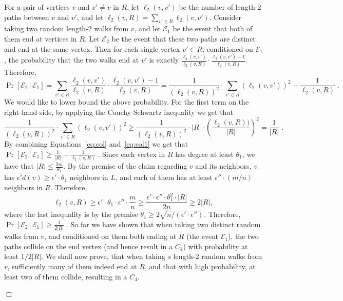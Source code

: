 \documentclass{article}
\newcommand{\eps}{\epsilon}
\newenvironment{proof}{\smallskip\noindent{\bf Proof:}}%
        {\hspace*{\fill}$\Box$\par}
\begin{document}
\begin{proof}
For a pair of vertices $v$ and $v'\neq v$ in $R$, let $\ell_2(v,v')$ be the number of length-2 paths between $v$ and $v'$, and let $\ell_2(v,R) = \sum_{v'\in R} \ell_2(v,v')$.  Consider taking two random length-2 walks from $v$, and let $\mathcal{E}_1$ be the event that both of them end at vertices in $R$. Let $\mathcal{E}_2$ be the event that these two paths are distinct and end at the same vertex. Then for each single vertex $v'\in R$, conditioned on $\mathcal{E}_1$, the probability that the two walks end at $v'$ is exactly $\frac{\ell_2(v,v')}{\ell_2(v,R)}\cdot   \frac{\ell_2(v,v')-1}{\ell_2(v,R)}$.
Therefore,
\begin{equation} \label{eq:col}
\Pr[\mathcal{E}_2\,| \, \mathcal{E}_1] = \sum_{v'\in R} \frac{\ell_2(v,v')}{\ell_2(v,R)}\cdot   \frac{\ell_2(v,v')-1}{\ell_2(v,R)}
=  \frac{1}{(\ell_2(v,R))^2} \cdot \sum_{v'\in R} (\ell_2(v,v'))^2 - \frac{1}{\ell_2(v,R)}\;.
\end{equation}
We would like to lower bound the above probability.
For the first term on the right-hand-side, by applying the Cauchy-Schwartz inequality we get that
\begin{equation}\label{eq:col1}
\frac{1}{(\ell_2(v,R))^2} \cdot \sum_{v'\in R} (\ell_2(v,v'))^2 \geq  \frac{1}{(\ell_2(v,R))^2} \cdot |R| \cdot \left( \frac{\ell_2(v,R))}{|R|}\right)^2 = \frac{1}{|R|}\;.
\end{equation}
By combining Equations~\eqref{eq:col} and~\eqref{eq:col1} we get that
$\Pr[\mathcal{E}_2\,| \, \mathcal{E}_1] \geq \frac{1}{|R|} - \frac{1}{\ell_2(v,R)}\;.
$
Since each vertex in $R$ has degree at least $\theta_1$, we have that $|R| \leq \frac{2m}{\theta_1}$. 
By the premise of the claim regarding $v$ and its neighbors, $v$ has $\eps' d(v)\geq \eps'\cdot \theta_1$ neighbors in $L$, and each of them has 
at least $\eps''\cdot (m/n)$ neighbors in $R$. Therefore,
\begin{equation}
\ell_2(v,R) \geq \eps'\cdot \theta_1\cdot \eps''\cdot \frac{m}{n} 
 \geq \frac{\eps'\cdot \eps''\cdot \theta_1^2 \cdot |R|}{2n}\geq 2|R|,
\end{equation}
where the last inequality is by the premise $\theta_1 \geq 2\sqrt{n/(\eps'\cdot \eps'')}$. Therefore,
$\Pr[\mathcal{E}_2\,| \, \mathcal{E}_1] \geq \frac{1}{2|R|} \;.$
So far we have shown that when taking two distinct random walks from $v$, and conditioned on them both ending at $R$ (the event $\mathcal{E}_1$), the two paths collide on the end vertex (and hence result in a $C_4$) with probability at least $1/2|R|$. We shall now prove, 
that when taking $s$ length-2 random walks from $v$, sufficiently many of them indeed end at $R$, and that with high probability, at least two of them collide, resulting in a $C_4$.


\end{proof}
\end{document}
